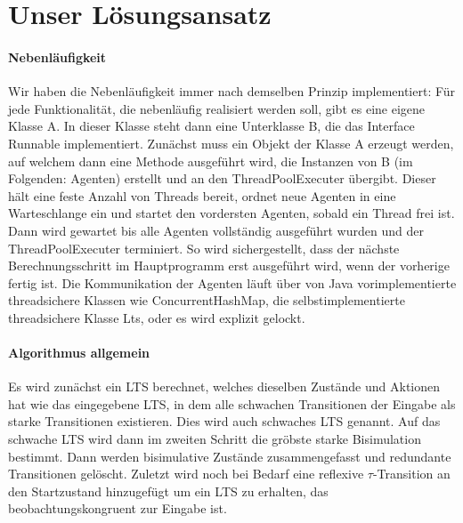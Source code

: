 \documentclass[a4paper]{scrartcl}
\begin{document}
\section* {Unser Lösungsansatz}
\paragraph*{Nebenläufigkeit}
Wir haben die Nebenläufigkeit immer nach demselben Prinzip implementiert:
Für jede Funktionalität, die nebenläufig realisiert werden soll, gibt es eine eigene Klasse A. In dieser Klasse steht dann eine Unterklasse B, die das Interface Runnable implementiert. Zunächst muss ein Objekt der Klasse A erzeugt werden, auf welchem dann eine Methode ausgeführt wird, die Instanzen von B (im Folgenden: Agenten) erstellt und an den ThreadPoolExecuter übergibt. Dieser hält eine feste Anzahl von Threads bereit, ordnet neue Agenten in eine Warteschlange ein und startet den vordersten Agenten, sobald ein Thread frei ist.
 Dann wird gewartet bis alle Agenten vollständig ausgeführt wurden und der ThreadPoolExecuter terminiert. So wird sichergestellt, dass der nächste Berechnungsschritt im Hauptprogramm erst ausgeführt wird, wenn der vorherige fertig ist. Die Kommunikation der Agenten läuft über von Java vorimplementierte threadsichere Klassen wie ConcurrentHashMap, die selbstimplementierte threadsichere Klasse Lts, oder es wird explizit gelockt.
 
\paragraph*{Algorithmus allgemein}
Es wird zunächst ein LTS berechnet, welches dieselben Zustände und Aktionen hat wie das eingegebene LTS, in dem alle schwachen Transitionen der Eingabe als starke Transitionen existieren. Dies wird auch schwaches LTS genannt. Auf das schwache LTS wird dann im zweiten Schritt die gröbste starke Bisimulation bestimmt. Dann werden bisimulative Zustände zusammengefasst und redundante Transitionen gelöscht. Zuletzt wird noch bei Bedarf eine reflexive $\tau$-Transition an den Startzustand hinzugefügt um ein LTS zu erhalten, das beobachtungskongruent zur Eingabe ist.
\end{document}
